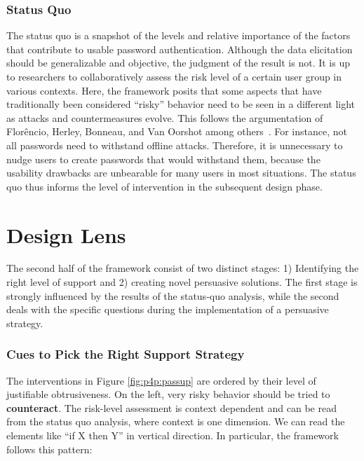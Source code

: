 \subsubsection{Status Quo}
The status quo is a snapshot of the levels and relative importance of the factors that contribute to usable password authentication. Although the data elicitation should be generalizable and objective, the judgment of the result is not. It is up to researchers to collaboratively assess the risk level of a certain user group in various contexts. Here, the framework posits that some aspects that have traditionally been considered ``risky'' behavior need to be seen in a different light as attacks and countermeasures evolve. This follows the argumentation of Florêncio, Herley, Bonneau, and Van Oorshot among others \cite{Bonneau2012ReplacePasswords,Florencio2016CommACM, Herley2012PersistenceOfPasswords,ZhangKennedy2016RevisitingPasswordRules}. For instance, not all passwords need to withstand offline attacks. Therefore, it is unnecessary to nudge users to create passwords that would withstand them, because the usability drawbacks are unbearable for many users in most situations. The status quo thus informs the level of intervention in the subsequent design phase.

\section{Design Lens}
The second half of the framework consist of two distinct stages: 1) Identifying the right level of support and 2) creating novel persuasive solutions. The first stage is strongly influenced by the results of the status-quo analysis, while the second deals with the specific questions during the implementation of a persuasive strategy. 

\subsubsection{Cues to Pick the Right Support Strategy} The interventions in Figure \ref{fig:p4p:passup} are ordered by their level of justifiable obtrusiveness. On the left, very risky behavior should be tried to \textbf{counteract}. The risk-level assessment is context dependent and can be read from the status quo analysis, where context is one dimension. We can read the elements like ``if X then Y'' in vertical direction. In particular, the framework follows this pattern:

